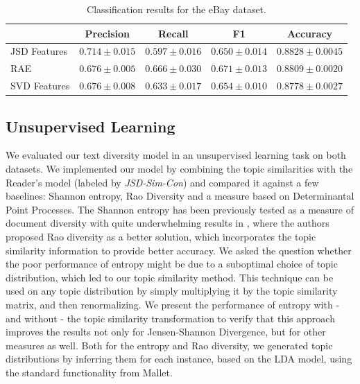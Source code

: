 \begin{table}[t]
\label{tab:classification-results}
\vspace{4mm}
\begin{center}
\begin{tabular}{|l|c|c|c|c|}
\hline
&Precision & Recall & F1 & Accuracy
\\ \hline 
JSD Features         &$\mathbf{0.714}\pm 0.015$&$0.597\pm 0.016$&$0.650\pm
0.014$& $\mathbf{0.8828}\pm 0.0045$\\
RAE             &$0.676\pm 0.005$&$\mathbf{0.666}\pm 0.030$&$\mathbf{0.671}\pm
0.013$&$0.8809\pm 0.0020$ \\
SVD Features             &$0.676\pm 0.008$&$0.633\pm 0.017$&$0.654\pm
0.010$&$0.8778\pm 0.0027$\\
\hline
\end{tabular}
\caption{Classification results for the eBay dataset.}
\end{center}
\end{table}

\subsection{Unsupervised Learning}
\label{sec:unsupervised-learning}

We evaluated our text diversity model in an unsupervised learning task
on both datasets.
We implemented our model by combining the topic similarities with the
Reader's model (labeled by {\em JSD-Sim-Con}) and compared it against a few
baselines: Shannon entropy, Rao Diversity and a measure
based on Determinantal Point Processes.
The Shannon entropy has
been previously tested as a measure of document diversity with quite
underwhelming results in \cite{bache:2013}, where the authors proposed 
Rao diversity as a better solution, which incorporates the topic similarity
information to provide better accuracy. We asked the question whether
the poor performance of entropy might be due to a suboptimal choice of
topic distribution, which led to our topic similarity
method. This technique can be used on any topic distribution
by simply multiplying it by the topic similarity matrix, and then
renormalizing. We present the performance of entropy with - and
without - the topic
similarity transformation to verify that this approach improves the results not
only for Jensen-Shannon Divergence, but for other measures as well.
Both for the entropy and Rao diversity, we generated topic
distributions by inferring them for each instance, based on the LDA
model, using the standard functionality from Mallet.

